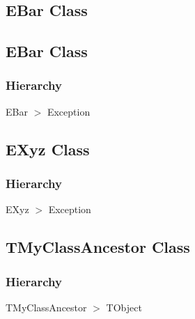 \documentclass{report}
\newif\ifpdf
\begin{document}
\subsection*{\large{\textbf{EBar Class}}\normalsize\hspace{1ex}\hrulefill}
\else
\subsection*{EBar Class}
\fi
\label{ok_expanding_descriptions.EBar}
\subsubsection*{\large{\textbf{Hierarchy}}\normalsize\hspace{1ex}\hfill}
EBar {$>$} Exception
\ifpdf
\subsection*{\large{\textbf{EXyz Class}}\normalsize\hspace{1ex}\hrulefill}
\else
\subsection*{EXyz Class}
\fi
\label{ok_expanding_descriptions.EXyz}
\subsubsection*{\large{\textbf{Hierarchy}}\normalsize\hspace{1ex}\hfill}
EXyz {$>$} Exception
\ifpdf
\subsection*{\large{\textbf{TMyClassAncestor Class}}\normalsize\hspace{1ex}\hrulefill}
\else
\subsection*{TMyClassAncestor Class}
\fi
\label{ok_expanding_descriptions.TMyClassAncestor}
\subsubsection*{\large{\textbf{Hierarchy}}\normalsize\hspace{1ex}\hfill}
TMyClassAncestor {$>$} TObject
\end{document}
